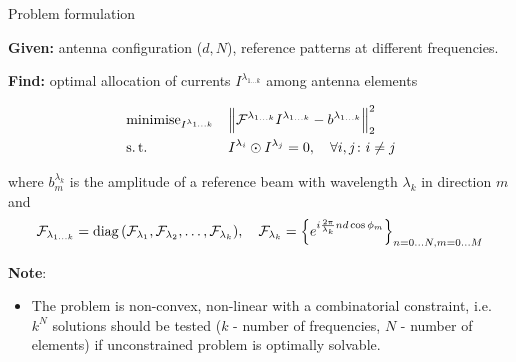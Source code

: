 \documentclass[../main.tex]{subfiles}
\begin{document}
\begin{frame}[t]{Problem formulation}

\textbf{Given:} antenna configuration ($d, N$), reference patterns at different frequencies.

\textbf{Find:} optimal allocation of currents $I^{\lambda_{1\ldots k}}$ among antenna elements
    
\begin{equation*}
\begin{aligned}
& \operatorname{minimise}_{I^{\lambda_{1\ldots k}}} 
& & \Big\| \mathcal{F}^{\lambda_{1 \ldots k}} I^{\lambda_{1\ldots k}} - b^{\lambda_{1 \ldots k}} \Big\|_2^2 \\
& \operatorname{s.t.}
& & I^{\lambda_i} \odot I^{\lambda_j} = 0, \quad \forall i, j \colon i \ne j \\
\end{aligned}
\end{equation*}

where $b^{\lambda_{k}}_m$ is the amplitude of a reference beam with wavelength $\lambda_{k}$ in direction $m$ and
\begin{equation*}
  \mathcal{F}_{\lambda_{1 \ldots k}} = \operatorname{diag}{(\mathcal{F}_{\lambda_1}, \mathcal{F}_{\lambda_2}, \ldots, \mathcal{F}_{\lambda_k})}, \quad \mathcal{F}_{\lambda_{k}} = \Big\{ e^{i \frac{2\pi}{\lambda_k}n d \cos{\phi_m}} \Big\}_{n=0\ldots N, m = 0\ldots M}
\end{equation*}

\textbf{Note}: 
\begin{itemize}
    \item The problem is non-convex, non-linear with a combinatorial constraint, i.e. $k^N$ solutions should be tested ($k$ - number of frequencies, $N$ - number of elements) if unconstrained problem is optimally solvable.
\end{itemize}

\end{frame}


%
%
\end{document}
